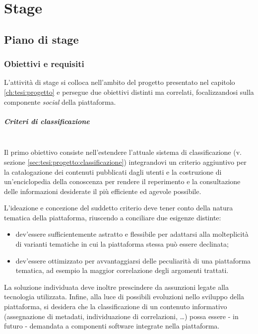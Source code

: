 \chapter{Stage}
\label{ch:tesi:stage}

\section{Piano di stage}
\label{sec:tesi:stage:piano}

\subsection{Obiettivi e requisiti}
\label{sec:tesi:stage:piano:obiettivi}
L'attività di stage si colloca nell'ambito del progetto presentato nel capitolo \ref{ch:tesi:progetto} e persegue due obiettivi distinti ma correlati, focalizzandosi sulla componente \textit{social} della piattaforma.

\paragraph{Criteri di classificazione} \hfill \\
Il primo obiettivo consiste nell'estendere l'attuale sistema di classificazione (v. sezione \ref{sec:tesi:progetto:classificazione}) integrandovi un criterio aggiuntivo per la catalogazione dei contenuti pubblicati dagli utenti e la costruzione di un'enciclopedia della conoscenza per rendere il reperimento e la consultazione delle informazioni desiderate il più efficiente ed agevole possibile.

L'ideazione e concezione del suddetto criterio deve tener conto della natura tematica della piattaforma, riuscendo a conciliare due esigenze distinte:
\begin{itemize}
\item dev'essere sufficientemente astratto e flessibile per adattarsi alla molteplicità di varianti tematiche in cui la piattaforma stessa può essere declinata;
\item dev'essere ottimizzato per avvantaggiarsi delle peculiarità di una piattaforma tematica, ad esempio la maggior correlazione degli argomenti trattati.
\end{itemize}

La soluzione individuata deve inoltre prescindere da assunzioni legate alla tecnologia utilizzata. Infine, alla luce di possibili evoluzioni nello sviluppo della piattaforma, si desidera che la classificazione di un contenuto informativo (assegnazione di metadati, individuazione di correlazioni, \ldots) possa essere - in futuro - demandata a componenti software integrate nella piattaforma.

